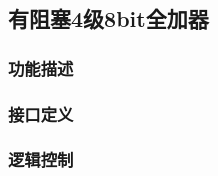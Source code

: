\subsection{有阻塞4级8bit全加器}\label{sub:ctl}
\subsubsection{功能描述}
\subsubsection{接口定义}
\subsubsection{逻辑控制}
